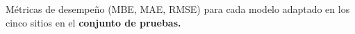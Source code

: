 \documentclass[letterpaper,12pt, twoside]{report}
\providecommand{\DIFdeltex}[1]{{\protect\color{red} \scriptsize #1}} %
\providecommand{\DIFdelFL}[1]{\DIFdel{#1}} %
\providecommand{\DIFdel}[1]{\texorpdfstring{\DIFdeltex{#1}}{}} %
\begin{document}
{%
\DIFdelFL{Métricas de desempeño (MBE, MAE, RMSE) para cada modelo adaptado en los cinco sitios en el \textbf{conjunto de pruebas.}}}
\end{document}
